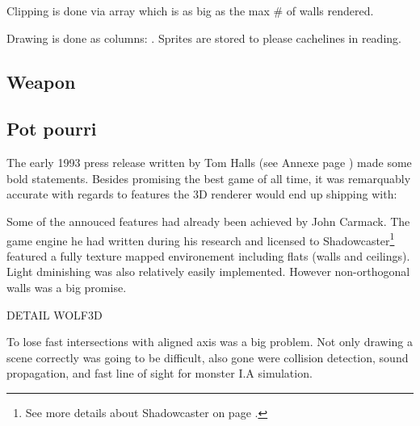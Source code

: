 Clipping is done via  array which is as big as the max \# of walls rendered.\\
\par
Drawing is done as columns: . Sprites are stored to please cachelines in reading.







\subsection{Weapon}

\subsection{Pot pourri}
The early 1993 press release written by Tom Halls (see Annexe page \pageref{label_press_release}) made some bold statements. Besides promising the best game of all time, it was remarquably accurate with regards to features the 3D renderer would end up shipping with:\\
\par
\par
Some of the annouced features had already been achieved by John Carmack. The game engine he had written during his research and licensed to Shadowcaster\footnote{See more details about Shadowcaster on page \pageref{label_shadowcaster}.} featured a fully texture mapped environement including flats (walls and ceilings). Light dminishing was also relatively easily implemented. However non-orthogonal walls was a big promise.\\
\par
DETAIL WOLF3D\\
\par
To lose fast intersections with aligned axis was a big problem. Not only drawing a scene correctly was going to be difficult, also gone were collision detection, sound propagation, and fast line of sight for monster I.A simulation.\\
\par
{}
